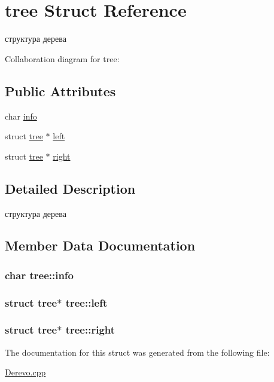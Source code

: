 \hypertarget{structtree}{\section{tree Struct Reference}
\label{structtree}
}


структура дерева  




Collaboration diagram for tree\-:
\subsection*{Public Attributes}
\begin{DoxyCompactItemize}
\item 
char \hyperlink{structtree_aa2364e293fd7f793367711b97100556c}{info}
\item 
struct \hyperlink{structtree}{tree} $\ast$ \hyperlink{structtree_a719b6f34a3ac12d46c29f9b7d6308438}{left}
\item 
struct \hyperlink{structtree}{tree} $\ast$ \hyperlink{structtree_a50cf9e7e35dcd0cc2f207389d1ac8852}{right}
\end{DoxyCompactItemize}


\subsection{Detailed Description}
структура дерева 

\subsection{Member Data Documentation}
\hypertarget{structtree_aa2364e293fd7f793367711b97100556c}{
\subsubsection[{info}]{\setlength{\rightskip}{0pt plus 5cm}char tree\-::info}}\label{structtree_aa2364e293fd7f793367711b97100556c}
\hypertarget{structtree_a719b6f34a3ac12d46c29f9b7d6308438}{
\subsubsection[{left}]{\setlength{\rightskip}{0pt plus 5cm}struct {\bf tree}$\ast$ tree\-::left}}\label{structtree_a719b6f34a3ac12d46c29f9b7d6308438}
\hypertarget{structtree_a50cf9e7e35dcd0cc2f207389d1ac8852}{
\subsubsection[{right}]{\setlength{\rightskip}{0pt plus 5cm}struct {\bf tree}$\ast$ tree\-::right}}\label{structtree_a50cf9e7e35dcd0cc2f207389d1ac8852}


The documentation for this struct was generated from the following file\-:\begin{DoxyCompactItemize}
\item 
\hyperlink{_derevo_8cpp}{Derevo.\-cpp}\end{DoxyCompactItemize}
